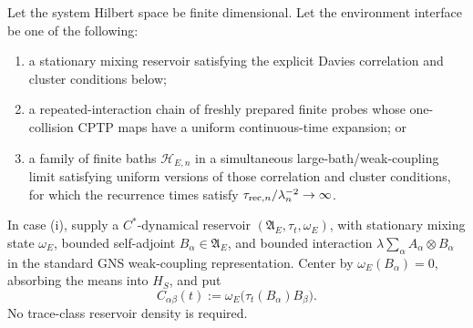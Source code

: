 \documentclass[12pt,a4paper]{article}
\begin{document}
\begin{theorem}
\label{p4:thm:microscopic-bath-gkls}
Let the system Hilbert space be finite dimensional.  Let the environment
interface be one of the following:
\begin{enumerate}[label=(\roman*), leftmargin=2em]
\item a stationary mixing reservoir satisfying the explicit Davies
correlation and cluster conditions below;
\item a repeated-interaction chain of freshly prepared finite probes whose
one-collision CPTP maps have a uniform continuous-time expansion; or
\item a family of finite baths \(\mathcal H_{E,n}\) in a simultaneous
large-bath/weak-coupling limit satisfying uniform versions of those
correlation and cluster conditions, for which the recurrence times satisfy
\(\tau_{{\rm rec},n}/\lambda_n^{-2}\to\infty\).
\end{enumerate}
In case (i), supply a \(C^*\)-dynamical reservoir
\((\mathfrak A_E,\tau_t,\omega_E)\), with stationary mixing state
\(\omega_E\), bounded self-adjoint \(B_\alpha\in\mathfrak A_E\), and
bounded interaction
\(\lambda\sum_\alpha A_\alpha\otimes B_\alpha\) in the standard GNS
weak-coupling representation.  Center by
\(\omega_E(B_\alpha)=0\), absorbing the means into \(H_S\), and put
\[
C_{\alpha\beta}(t)
:=
\omega_E\!\bigl(\tau_t(B_\alpha)B_\beta\bigr).
\]
No trace-class reservoir density is required.


\end{theorem}
\end{document}
